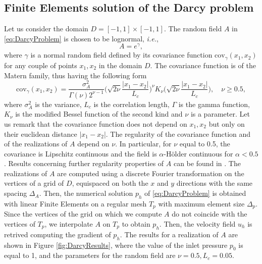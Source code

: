 

\subsection{Finite Elements solution of the Darcy problem}

Let us consider the domain $D = [-1,1] \times [-1,1]$. The random field $A$ in \eqref{eq:DarcyProblem} is chosen to be lognormal, \textit{i.e.}, 
\begin{equation}\label{eq:RandomField}
	A = e^\gamma,
\end{equation}
where $\gamma$ is a normal random field defined by its covariance function $\mathrm{cov}_\gamma(x_1,x_2)$ for any couple of points $x_1,x_2$ in the domain $D$. The covariance function is of the Matern family, thus having the following form
\begin{equation}\label{eq:CovFunction}
	\mathrm{cov}_\gamma(x_1,x_2) = \frac{\sigma_A^2}{\Gamma(\nu)2^{\nu-1}}\Big(\sqrt{2\nu}\frac{|x_1-x_2|}{L_c}\Big)^\nu K_{\nu}\Big(\sqrt{2\nu}\frac{|x_1-x_2|}{L_c}\Big), \quad \nu \geq 0.5,
\end{equation}
where $\sigma_A^2$ is the variance, $L_c$ is the correlation length, $\Gamma$ is the gamma function, $K_\nu$ is the modified Bessel function of the second kind and $\nu$ is a parameter. Let us remark that the covariance function does not depend on $x_1, x_2$ but only on their euclidean distance $|x_1 - x_2|$. The regularity of the covariance function and of the realizations of $A$ depend on $\nu$. In particular, for $\nu$ equal to 0.5, the covariance is Lipschitz continuous and the field is $\alpha$-Hölder continuous for $\alpha < 0.5$. Results concerning further regularity properties of $A$ can be found in \cite{Nobile2015}. The realizations of $A$ are computed using a discrete Fourier transformation on the vertices of a grid of $D$, equispaced on both the $x$ and $y$ directions with the same spacing $\Delta_A$. Then, the numerical solution $p_h$ of \eqref{eq:DarcyProblem} is obtained with linear Finite Elements on a regular mesh $T_p$ with maximum element size $\Delta_p$. Since the vertices of the grid on which we compute $A$ do not coincide with the vertices of $T_p$, we interpolate $A$ on $T_p$ to obtain $p_h$. Then, the velocity field $u_h$ is retrived computing the gradient of $p_h$. The results for a realization of $A$ are shown in Figure \ref{fig:DarcyResults}, where the value of the inlet pressure $p_0$ is equal to 1, and the parameters for the random field are $\nu = 0.5, L_c = 0.05$. 

